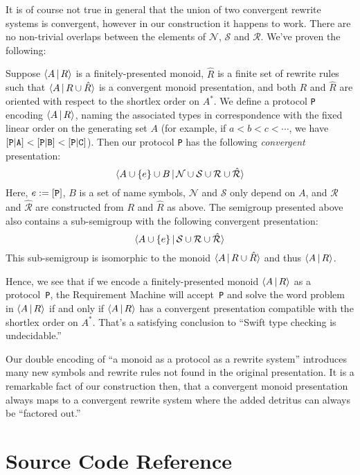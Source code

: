 \documentclass[../generics]{subfiles}
\begin{document}
\begin{example}
It is of course not true in general that the union of two convergent rewrite systems is convergent, however in our construction it happens to work. There are no non-trivial overlaps between the elements of $\mathcal{N}$, $\mathcal{S}$ and $\mathcal{R}$. We've proven the following:
\begin{theorem}
Suppose $\langle A\,|\,R\rangle$ is a finitely-presented monoid, $\hat{R}$ is a finite set of rewrite rules such that $\langle A\,|\,R\cup\hat{R}\rangle$ is a convergent monoid presentation, and both $R$ and $\hat{R}$ are oriented with respect to the shortlex order on $A^*$. We define a protocol \texttt{P} encoding $\langle A\,|\,R\rangle$, naming the associated types in correspondence with the fixed linear order on the generating set $A$ (for example, if $a<b<c<\cdots$, we have $[\texttt{P}|\texttt{A}]<[\texttt{P}|\texttt{B}]<[\texttt{P}|\texttt{C}]$). Then our protocol \texttt{P} has the following \emph{convergent} presentation:
\[\langle A\cup\{e\}\cup B\,|\,\mathcal{N}\cup\mathcal{S}\cup\mathcal{R}\cup\hat{\mathcal{R}}\rangle\]
Here, $e:=[\texttt{P}]$, $B$ is a set of name symbols, $\mathcal{N}$ and $\mathcal{S}$ only depend on $A$, and $\mathcal{R}$ and $\hat{\mathcal{R}}$ are constructed from $R$ and $\hat{R}$ as above. The semigroup presented above also contains a sub-semigroup with the following convergent presentation:
\[\langle A\cup\{e\}\,|\,\mathcal{S}\cup\mathcal{R}\cup\hat{\mathcal{R}}\rangle\]
This sub-semigroup is isomorphic to the monoid $\langle A\,|\,R\cup\hat{R}\rangle$ and thus $\langle A\,|\,R\rangle$.
\end{theorem}

Hence, we see that if we encode a finitely-presented monoid $\langle A\,|\,R\rangle$ as a protocol~\texttt{P}, the Requirement Machine will accept~\texttt{P} and solve the word problem in $\langle A\,|\,R\rangle$ if and only if $\langle A\,|\,R\rangle$ has a convergent presentation compatible with the shortlex order on $A^*$. That's a satisfying conclusion to ``Swift type checking is undecidable.''

Our double encoding of ``a monoid as a protocol as a rewrite system'' introduces many new symbols and rewrite rules not found in the original presentation. It is a remarkable fact of our construction then, that a convergent monoid presentation always maps to a convergent rewrite system where the added detritus can always be ``factored out.''
\end{example}

\section{Source Code Reference}\label{completion sourceref}
\end{document}
